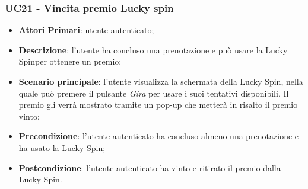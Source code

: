 \subsubsection{UC21 - Vincita premio Lucky spin}
\begin{itemize}
	\item \textbf{Attori Primari}: utente autenticato;
	\item \textbf{Descrizione}: l'utente ha concluso una prenotazione e può usare la Lucky Spin\glosp per ottenere un premio;	
	\item \textbf{Scenario principale}: l'utente visualizza la schermata della Lucky Spin, nella quale può premere il pulsante \textit{Gira} per usare i suoi tentativi disponibili. Il premio gli verrà mostrato tramite un pop-up che metterà in risalto il premio vinto;
	\item \textbf{Precondizione}: l'utente autenticato ha concluso almeno una prenotazione e ha usato la Lucky Spin;
	\item \textbf{Postcondizione}: l'utente autenticato ha vinto e ritirato il premio dalla Lucky Spin.
\end{itemize}
